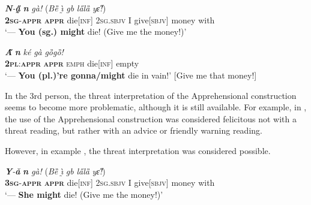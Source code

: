 \documentclass[output=paper,colorlinks,citecolor=brown]{langscibook}
\begin{document}
\ea \label{ex:Fed33}
\gll \textit{\textbf{N}-\textbf{a̰̋}} \textit{\textbf{n{\ù}}} \textit{gà!} \textup{(}\textit{Bȅ} \textit{ı̰̀} \textit{gb{\à}} \textit{la̋lȁ} \textit{yɛ̋!}\textup{)} \\
\textsc{\textbf{2sg}-\textbf{appr}} \textsc{\textbf{appr}} die[\textsc{inf}]  \textsc{2sg.sbjv} I give\textsc{[sbjv]} money with \\
\glt [A robber:] `--- \textbf{You (sg.) might} die! (Give me the money!)'
\z


\ea \label{ex:Fed34}
\gll \textit{\textbf{A̋}} \textit{\textbf{n{\ù}}} \textit{ké} \textit{gà} \textit{gȍgȍ!} \\
\textsc{\textbf{2pl}:\textbf{appr}} \textsc{\textbf{appr}} \textsc{emph} die[\textsc{inf}] empty \\
\glt [A robber:] `— \textbf{You (pl.)'re gonna/might} die in vain!' [Give me that money!]
\z


 In the 3rd person, the threat interpretation of the Apprehensional construction seems to become more problematic, although it is still available. For example, in , the use of the Apprehensional construction was considered felicitous not with a threat reading, but rather with an advice or friendly warning reading.


\z

 However, in example , the threat interpretation was considered possible.


\ea \label{ex:Fed36}
\gll \textit{\textbf{Y}-\textbf{ǎ}} \textit{\textbf{n{\ù}}} \textit{gà!}  \textup{(}\textit{Bȅ} \textit{ı̰̀} \textit{gb{\à}} \textit{la̋lȁ} \textit{yɛ̋!}\textup{)} \\
\textsc{\textbf{3sg}-\textbf{appr}} \textsc{\textbf{appr}} die\textsc{[inf]} \textsc{2sg.sbjv} I give[\textsc{sbjv}] money with \\
 `--- \textbf{She might} die! (Give me the money!)'
\z
\end{document}

